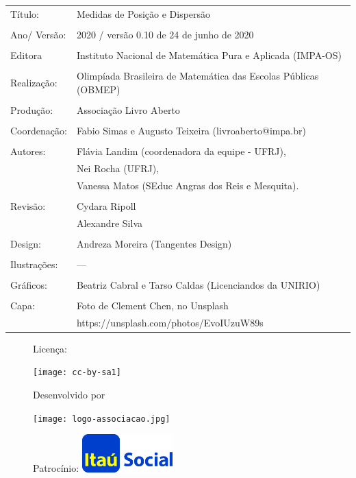 \begin{tabular}{p{}p{}}
Título: & Medidas de Posição e Dispersão\\
\\
Ano/ Versão: & 2020 / versão 0.10 de 24 de junho de 2020\\
\\
Editora & Instituto Nacional de Matem\'atica Pura e Aplicada (IMPA-OS)\\
\\
Realização:& Olimp\'iada Brasileira de Matem\'atica das Escolas P\'ublicas (OBMEP)\\
\\
Produção:& Associação Livro Aberto\\
\\
Coordenação: & Fabio Simas e Augusto Teixeira (livroaberto@impa.br)\\
\\
  Autores: & Flávia Landim (coordenadora da equipe - UFRJ),\\
        & Nei Rocha (UFRJ),\\
             & Vanessa Matos (SEduc Angras dos Reis e Mesquita).\\
\\
Revisão: &  Cydara Ripoll  \\
		 &  Alexandre Silva \\
\\
Design: & Andreza Moreira (Tangentes Design) \\
\\
  Ilustrações: & --- \\ 
\\
Gráficos: & Beatriz Cabral e Tarso Caldas (Licenciandos da UNIRIO)\\
\\
  Capa: & Foto de Clement Chen, no Unsplash\\
  		& https://unsplash.com/photos/EvoIUzuW89s \\

\end{tabular}


\begin{figure}[b]
\begin{minipage}[l]{5cm}
\centering

{\large Licença:}

  \texttt{[image: cc-by-sa1]}
\end{minipage}\hfill
\begin{minipage}[c]{5cm}
\centering
{\large Desenvolvido por}

\texttt{[image: logo-associacao.jpg]}
\end{minipage}
\begin{minipage}[r]{5cm}
\centering

{\large Patrocínio:}
  \vspace{1em}
  \includegraphics[width=3.5cm]{itau}
\end{minipage}
\end{figure}

